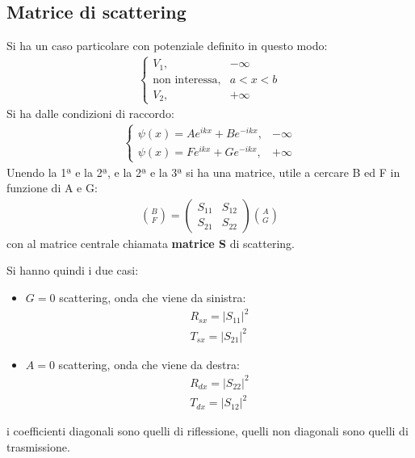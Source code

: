 \subsection{Matrice di scattering} %
Si ha un caso particolare con potenziale definito in questo modo:
\begin{equation}\begin{split}
\begin{cases}
V_1, & -\infty \\
\textrm{non interessa}, & a<x<b \\
V_2, & +\infty 
\end{cases}
\end{split}\end{equation}
Si ha dalle condizioni di raccordo:
\begin{equation}\begin{split}
\begin{cases}
\psi \left(x\right)=Ae^{ikx}+Be^{-ikx}, & -\infty \\
\psi \left(x\right)=Fe^{ikx}+Ge^{-ikx}, & +\infty 
\end{cases}
\end{split}\end{equation}
Unendo la 1ª e la 2ª, e la 2ª e la 3ª si ha una matrice, utile a cercare B ed F in funzione di A e G:
\begin{equation}\begin{split}
{B\choose F} =\left(\begin{matrix} {S_{11}} & {S_{12}}\\{S_{21}} & {S_{22}}\end{matrix}\right){{A}\choose{G}}
\end{split}\end{equation}
con al matrice centrale chiamata \textbf{matrice S} di scattering.

Si hanno quindi i due casi:
\begin{itemize}
\item $G=0$ scattering, onda che viene da sinistra:
\begin{equation}\begin{split}
R_{sx}=|S_{11}|^2 \\
T_{sx}=|S_{21}|^2
\end{split}\end{equation}
\item $A=0$ scattering, onda che viene da destra:
\begin{equation}\begin{split}
R_{dx}=|S_{22}|^2 \\
T_{dx}=|S_{12}|^2
\end{split}\end{equation}
\end{itemize}
i coefficienti diagonali sono quelli di riflessione, quelli non diagonali sono quelli di trasmissione. \\

